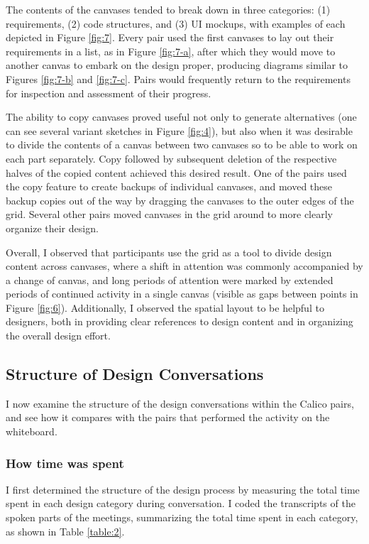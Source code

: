 The contents of the canvases tended to break down in three categories: (1) requirements, (2) code structures, and (3) UI mockups, with examples of each depicted in Figure \ref{fig:7}. Every pair used the first canvases to lay out their requirements in a list, as in Figure \ref{fig:7-a}, after which they would move to another canvas to embark on the design proper, producing diagrams similar to Figures \ref{fig:7-b} and \ref{fig:7-c}. Pairs would frequently return to the requirements for inspection and assessment of their progress.

The ability to copy canvases proved useful not only to generate alternatives (one can see several variant sketches in Figure \ref{fig:4}), but also when it was desirable to divide the contents of a canvas between two canvases so to be able to work on each part separately. Copy followed by subsequent deletion of the respective halves of the copied content achieved this desired result. One of the pairs used the copy feature to create backups of individual canvases, and moved these backup copies out of the way by dragging the canvases to the outer edges of the grid. Several other pairs moved canvases in the grid around to more clearly organize their design.

Overall, I observed that participants use the grid as a tool to divide design content across canvases, where a shift in attention was commonly accompanied by a change of canvas, and long periods of attention were marked by extended periods of continued activity in a single canvas (visible as gaps between points in Figure \ref{fig:6}). Additionally, I observed the spatial layout to be helpful to designers, both in providing clear references to design content and in organizing the overall design effort.


\subsection {Structure of Design Conversations}
\label{results:3}

I now examine the structure of the design conversations within the Calico pairs, and see how it compares with the pairs that performed the activity on the whiteboard. 

\subsubsection {How time was spent}
\label{results:31}

I first determined the structure of the design process by measuring the total time spent in each design category during conversation. I coded the transcripts of the spoken parts of the meetings, summarizing the total time spent in each category, as shown in Table \ref{table:2}. 

